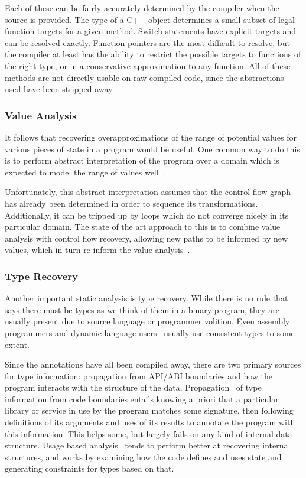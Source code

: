 Each of these can be fairly accurately determined by the compiler when the source is provided.
The type of a C++ object determines a small subset of legal function targets for a given method.
Switch statements have explicit targets and can be resolved exactly.
Function pointers are the most difficult to resolve, but the compiler at least has the ability to restrict the possible targets to functions of the right type, or in a conservative approximation to any function.
All of these methods are not directly usable on raw compiled code, since the abstractions used have been stripped away.

\subsubsection{Value Analysis}
\label{sec:valanal}
It follows that recovering overapproximations of the range of potential values for various pieces of state in a program would be useful.
One common way to do this is to perform abstract interpretation of the program over a domain which is expected to model the range of values well~\cite{vsa,wrappedintervals,wrappedintervals2}.

Unfortunately, this abstract interpretation assumes that the control flow graph has already been determined in order to sequence its transformations.
Additionally, it can be tripped up by loops which do not converge nicely in its particular domain.
The state of the art approach to this is to combine value analysis with control flow recovery, allowing new paths to be informed by new values, which in turn re-inform the value analysis~\cite{jakstab}.

\subsubsection{Type Recovery}
Another important static analysis is type recovery.
While there is no rule that says there must be types as we think of them in a binary program, they are usually present due to source language or programmer volition.
Even assembly programmers and dynamic language users~\cite{jsinfer} usually use consistent types to some extent.

Since the annotations have all been compiled away, there are two primary sources for type information: propagation from API/ABI boundaries and how the program interacts with the structure of the data.
Propagation~\cite{howard} of type information from code boundaries entails knowing a priori that a particular library or service in use by the program matches some signature, then following definitions of its arguments and uses of its results to annotate the program with this information.
This helps some, but largely fails on any kind of internal data structure.
Usage based analysis~\cite{tie,bitr} tends to perform better at recovering internal structures, and works by examining how the code defines and uses state and generating constraints for types based on that.

